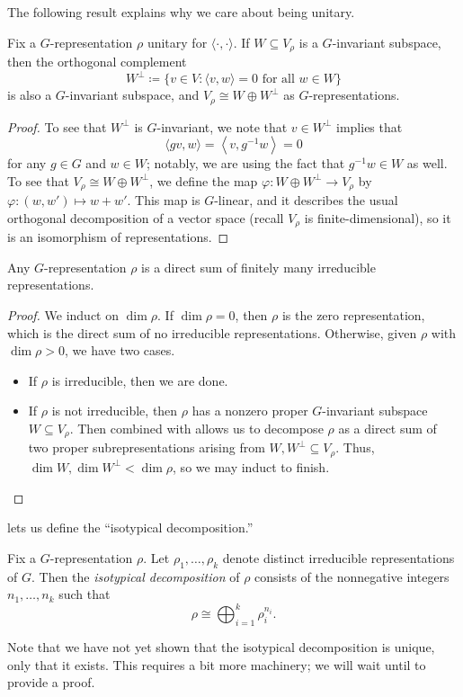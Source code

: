 \documentclass{article}
\begin{document}
The following result explains why we care about being unitary.
\begin{lemma} \label{lem:get-ortho-comp}
	Fix a $G$-representation $\rho$ unitary for $\langle\cdot,\cdot\rangle$. If $W\subseteq V_\rho$ is a $G$-invariant subspace, then the orthogonal complement
	\[W^\perp\coloneqq\{v\in V:\langle v,w\rangle=0\text{ for all }w\in W\}\]
	is also a $G$-invariant subspace, and $V_\rho\cong W\oplus W^\perp$ as $G$-representations.
\end{lemma}
\begin{proof}
	To see that $W^\perp$ is $G$-invariant, we note that $v\in W^\perp$ implies that
	\[\langle gv,w\rangle=\left\langle v,g^{-1}w\right\rangle=0\]
	for any $g\in G$ and $w\in W$; notably, we are using the fact that $g^{-1}w\in W$ as well. To see that $V_\rho\cong W\oplus W^\perp$, we define the map $\varphi\colon W\oplus W^\perp\to V_\rho$ by $\varphi\colon(w,w')\mapsto w+w'$. This map is $G$-linear, and it describes the usual orthogonal decomposition of a vector space (recall $V_\rho$ is finite-dimensional), so it is an isomorphism of representations.
\end{proof}
\begin{theorem}[Maschke] \label{thm:maschke}
	Any $G$-representation $\rho$ is a direct sum of finitely many irreducible representations.
\end{theorem}
\begin{proof}
	We induct on $\dim\rho$. If $\dim\rho=0$, then $\rho$ is the zero representation, which is the direct sum of no irreducible representations. Otherwise, given $\rho$ with $\dim\rho>0$, we have two cases.
	\begin{itemize}
		\item If $\rho$ is irreducible, then we are done.
		\item If $\rho$ is not irreducible, then $\rho$ has a nonzero proper $G$-invariant subspace $W\subseteq V_\rho$. Then  combined with  allows us to decompose $\rho$ as a direct sum of two proper subrepresentations arising from $W,W^\perp\subseteq V_\rho$. Thus, $\dim W,\dim W^\perp<\dim\rho$, so we may induct to finish.
		\qedhere
	\end{itemize}
\end{proof}
 lets us define the ``isotypical decomposition.''
\begin{definition}
	Fix a $G$-representation $\rho$. Let $\rho_1,\ldots,\rho_k$ denote distinct irreducible representations of $G$. Then the \textit{isotypical decomposition} of $\rho$ consists of the nonnegative integers $n_1,\ldots,n_k$ such that
	\[\rho\cong\bigoplus_{i=1}^k\rho_i^{n_i}.\]
\end{definition}
Note that we have not yet shown that the isotypical decomposition is unique, only that it exists. This requires a bit more machinery; we will wait until  to provide a proof.
\end{document}
